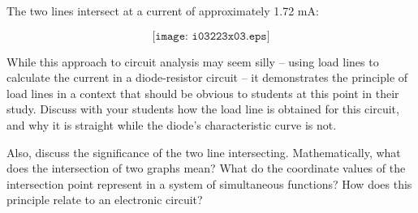 
The two lines intersect at a current of approximately 1.72 mA:

$$\texttt{[image: i03223x03.eps]}$$







While this approach to circuit analysis may seem silly -- using load lines to calculate the current in a diode-resistor circuit -- it demonstrates the principle of load lines in a context that should be obvious to students at this point in their study.  Discuss with your students how the load line is obtained for this circuit, and why it is straight while the diode's characteristic curve is not.  

Also, discuss the significance of the two line intersecting.  Mathematically, what does the intersection of two graphs mean?  What do the coordinate values of the intersection point represent in a system of simultaneous functions?  How does this principle relate to an electronic circuit?





